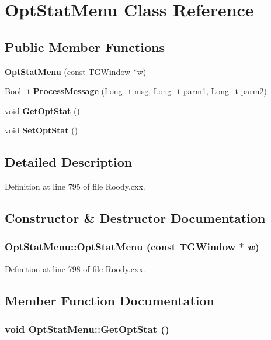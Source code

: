 \section{OptStatMenu Class Reference}
\label{classOptStatMenu}
\subsection*{Public Member Functions}
\begin{DoxyCompactItemize}
\item 
{\bf OptStatMenu} (const TGWindow $\ast$w)
\item 
Bool\_\-t {\bf ProcessMessage} (Long\_\-t msg, Long\_\-t parm1, Long\_\-t parm2)
\item 
void {\bf GetOptStat} ()
\item 
void {\bf SetOptStat} ()
\end{DoxyCompactItemize}


\subsection{Detailed Description}


Definition at line 795 of file Roody.cxx.

\subsection{Constructor \& Destructor Documentation}
\subsubsection[{OptStatMenu}]{\setlength{\rightskip}{0pt plus 5cm}OptStatMenu::OptStatMenu (const TGWindow $\ast$ {\em w})\hspace{0.3cm}{\ttfamily  [inline]}}\label{classOptStatMenu_ada753399463dafcb4524be09fb54081f}


Definition at line 798 of file Roody.cxx.

\subsection{Member Function Documentation}
\subsubsection[{GetOptStat}]{\setlength{\rightskip}{0pt plus 5cm}void OptStatMenu::GetOptStat ()\hspace{0.3cm}{\ttfamily  [inline]}}\label{classOptStatMenu_afed75c8a0cf3fd15ee05089ec5d8e6ab}


